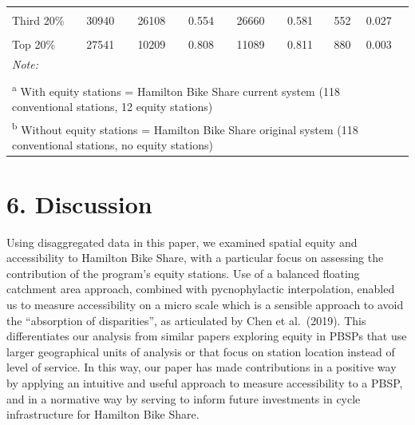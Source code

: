 \documentclass[]{elsarticle} %
\begin{document}
\begin{table}
{\begin{tabular}[t]{lccccccl}
\hspace{1em}\cellcolor{gray!6}{Second 20\%} & \cellcolor{gray!6}{33312} & \cellcolor{gray!6}{30507} & \cellcolor{gray!6}{0.555} & \cellcolor{gray!6}{31069} & \cellcolor{gray!6}{0.614} & \cellcolor{gray!6}{562} & \cellcolor{gray!6}{0.059}\\
\hspace{1em}Third 20\% & 30940 & 26108 & 0.554 & 26660 & 0.581 & 552 & 0.027\\
\hspace{1em}\cellcolor{gray!6}{Fourth 20\%} & \cellcolor{gray!6}{20185} & \cellcolor{gray!6}{6312} & \cellcolor{gray!6}{0.093} & \cellcolor{gray!6}{7435} & \cellcolor{gray!6}{0.096} & \cellcolor{gray!6}{1123} & \cellcolor{gray!6}{0.003}\\
\hspace{1em}Top 20\% & 27541 & 10209 & 0.808 & 11089 & 0.811 & 880 & 0.003\\
\bottomrule
\multicolumn{8}{l}{\rule{0pt}{1em}\textit{Note: }}\\
\multicolumn{8}{l}{\rule{0pt}{1em} }\\
\multicolumn{8}{l}{\rule{0pt}{1em}\textsuperscript{a} With equity stations = Hamilton Bike Share current system (118 conventional stations, 12 equity stations)}\\
\multicolumn{8}{l}{\rule{0pt}{1em}\textsuperscript{b} Without equity stations = Hamilton Bike Share original system (118 conventional stations, no equity stations)}\\
\end{tabular}}
\end{table}

\hypertarget{discussion}{%
\section{6. Discussion}\label{discussion}}

Using disaggregated data in this paper, we examined spatial equity and
accessibility to Hamilton Bike Share, with a particular focus on
assessing the contribution of the program's equity stations. Use of a
balanced floating catchment area approach, combined with pycnophylactic
interpolation, enabled us to measure accessibility on a micro scale
which is a sensible approach to avoid the ``absorption of disparities'',
as articulated by Chen et al.~(2019). This differentiates our analysis
from similar papers exploring equity in PBSPs that use larger
geographical units of analysis or that focus on station location instead
of level of service. In this way, our paper has made contributions in a
positive way by applying an intuitive and useful approach to measure
accessibility to a PBSP, and in a normative way by serving to inform
future investments in cycle infrastructure for Hamilton Bike Share.
\end{document}
